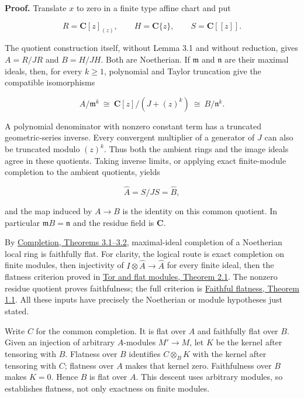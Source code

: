 \documentclass[11pt]{article}
\begin{document}
\textbf{Proof.} Translate \(x\) to zero in a finite type affine chart
and put

\[
R=\mathbf C[z]_{(z)},\qquad H=\mathbf C\{z\},\qquad
S=\mathbf C[[z]].
\]

The quotient construction itself, without Lemma 3.1 and without
reduction, gives \(A=R/JR\) and \(B=H/JH\). Both are Noetherian. If
\(\mathfrak m\) and \(\mathfrak n\) are their maximal ideals, then, for
every \(k\geq1\), polynomial and Taylor truncation give the compatible
isomorphisms

\[
A/\mathfrak m^k
\ \cong\ \mathbf C[z]/(J+(z)^k)
\ \cong\ B/\mathfrak n^k.
\]

A polynomial denominator with nonzero constant term has a truncated
geometric-series inverse. Every convergent multiplier of a generator of
\(J\) can also be truncated modulo \((z)^k\). Thus both the ambient
rings and the image ideals agree in these quotients. Taking inverse
limits, or applying exact finite-module completion to the ambient
quotients, yields

\[
\widehat A=S/JS=\widehat B,
\]

and the map induced by \(A\to B\) is the identity on this common
quotient. In particular \(\mathfrak mB=\mathfrak n\) and the residue
field is \(\mathbf C\).

By
\href{../../../../../../AG-CA/AG-CA-19.html\#3-noetherian-exactness-tensoring-and-flatness}{Completion,
Theorems 3.1--3.2}, maximal-ideal completion of a Noetherian local ring
is faithfully flat. For clarity, the logical route is exact completion
on finite modules, then injectivity of
\(I\otimes\widehat A\to\widehat A\) for every finite ideal, then the
flatness criterion proved in
\href{../../../../../../AG-CA/AG-CA-07.html\#2-the-ideal-and-tor-criteria}{Tor and flat
modules, Theorem 2.1}. The nonzero residue quotient proves faithfulness;
the full criterion is
\href{../../../../../../AG-CA/AG-CA-08.html\#1-detecting-nonzero-modules}{Faithful
flatness, Theorem 1.1}. All these inputs have precisely the Noetherian
or module hypotheses just stated.

Write \(C\) for the common completion. It is flat over \(A\) and
faithfully flat over \(B\). Given an injection of arbitrary
\(A\)-modules \(M'\to M\), let \(K\) be the kernel after tensoring with
\(B\). Flatness over \(B\) identifies \(C\otimes_BK\) with the kernel
after tensoring with \(C\); flatness over \(A\) makes that kernel zero.
Faithfulness over \(B\) makes \(K=0\). Hence \(B\) is flat over \(A\).
This descent uses arbitrary modules, so establishes flatness, not only
exactness on finite modules.
\end{document}

